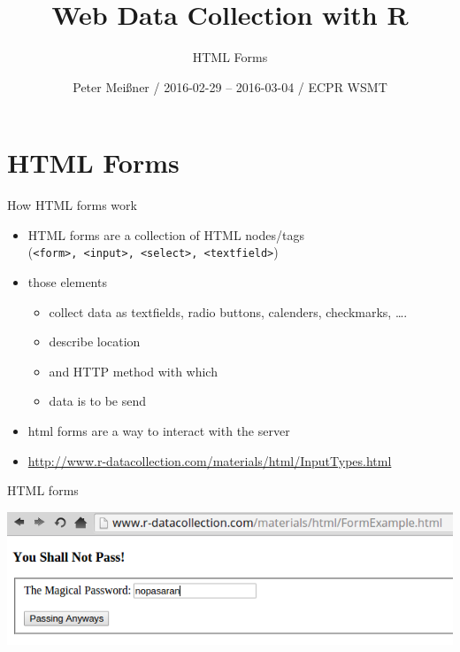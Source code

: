 \documentclass[ignorenonframetext,]{beamer}
\title{Web Data Collection with R}
\subtitle{HTML Forms}
\author{Peter Meißner / 2016-02-29 -- 2016-03-04 / ECPR WSMT}
\date{}
\providecommand{\tightlist}{%
  \setlength{\itemsep}{0pt}\setlength{\parskip}{0pt}}
\begin{document}
\frame{\titlepage}

\begin{frame}
\tableofcontents[hideallsubsections]
\end{frame}

\section{HTML Forms}\label{html-forms}

\begin{frame}[fragile]{How HTML forms work}

\begin{itemize}
\tightlist
\item
  HTML forms are a collection of HTML nodes/tags
  (\texttt{\textless{}form\textgreater{},\ \textless{}input\textgreater{},\ \textless{}select\textgreater{},\ \textless{}textfield\textgreater{}})
\item
  those elements

  \begin{itemize}
  \tightlist
  \item
    collect data as textfields, radio buttons, calenders, checkmarks,
    \ldots{}.
  \item
    describe location
  \item
    and HTTP method with which
  \item
    data is to be send
  \end{itemize}
\item
  html forms are a way to interact with the server
\item
  \url{http://www.r-datacollection.com/materials/html/InputTypes.html}
\end{itemize}

\end{frame}

\begin{frame}{HTML forms}

\includegraphics{fig/nopasaran.png}

\end{frame}
\end{document}
